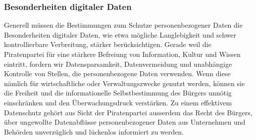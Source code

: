 \subsubsection{Besonderheiten digitaler Daten}
\abstimmung
Generell müssen die Bestimmungen zum Schutze personenbezogener Daten die Besonderheiten digitaler Daten, wie etwa mögliche Langlebigkeit und schwer kontrollierbare Verbreitung, stärker berücksichtigen. Gerade weil die Piratenpartei für eine stärkere Befreiung von Information, Kultur und Wissen eintritt, fordern wir Datensparsamkeit, Datenvermeidung und unabhängige Kontrolle von Stellen, die personenbezogene Daten verwenden. Wenn diese nämlich für wirtschaftliche oder Verwaltungszwecke genutzt werden, können sie die Freiheit und die informationelle Selbstbestimmung des Bürgers unnötig einschränken und den Überwachungsdruck verstärken. Zu einem effektivem Datenschutz gehört aus Sicht der Piratenpartei ausserdem das Recht des Bürgers, über ungewollte Datenabflüsse personenbezogener Daten aus Unternehmen und Behörden unverzüglich und lückenlos informiert zu werden.

\newpage

